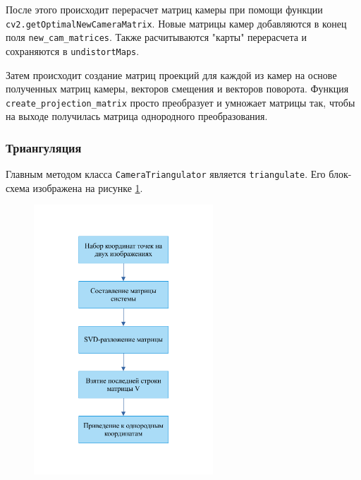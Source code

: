 \documentclass[12pt, a4paper]{article}
\begin{document}
После этого происходит перерасчет матриц камеры при помощи функции
\texttt{cv2.getOptimalNewCameraMatrix}. Новые матрицы камер добавляются в конец
поля \texttt{new\_cam\_matrices}. Также расчитываются "карты" перерасчета и
сохраняются в \texttt{undistortMaps}.

Затем происходит создание матриц проекций для каждой из камер на основе
полученных матриц камеры, векторов смещения и векторов поворота.
Функция \texttt{create\_projection\_matrix} просто преобразует и умножает
матрицы так, чтобы на выходе получилась матрица однородного преобразования.

\subsubsection{Триангуляция}
Главным методом класса \texttt{CameraTriangulator} является \texttt{triangulate}.
Его блок-схема изображена на рисунке \ref{fig:triangulation_scheme}.
\begin{figure}[h!]
  \begin{center}
    \includegraphics[width=0.6\textwidth]{images/block-schemes/triangulation_scheme.png}
  \end{center}
  \caption{}\label{fig:triangulation_scheme}
\end{figure}
\end{document}
